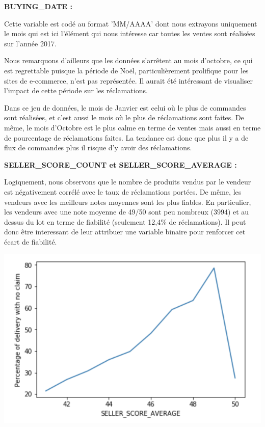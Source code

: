 \textbf{BUYING_DATE :}

Cette variable est codé au format 'MM/AAAA' dont nous extrayons uniquement le mois qui est ici 
l'élément qui nous intéresse car toutes les ventes sont réalisées sur l'année 2017.

Nous remarquons d'ailleurs que les données s'arrêtent au mois d'octobre, ce qui est regrettable
puisque la période de Noël, particulièrement prolifique pour les sites de e-commerce, n'est 
pas représentée. Il aurait été intéressant de visualiser l'impact de cette période sur les
réclamations.

Dans ce jeu de données, le mois de Janvier est celui où le plus de commandes sont réalisées,
et c'est aussi le mois où le plus de réclamations sont faites. De même, le mois d'Octobre
est le plus calme en terme de ventes mais aussi en terme de pourcentage de réclamations
faites. La tendance est donc que plus il y a de flux de commandes plus il risque d'y avoir
des réclamations.

\textbf{SELLER_SCORE_COUNT et SELLER_SCORE_AVERAGE :}

Logiquement, nous observons que le nombre de produits vendus par le vendeur est négativement
corrélé avec le taux de réclamations portées. De même, les vendeurs avec les meilleurs
notes moyennes sont les plus fiables. En particulier, les vendeurs avec une note moyenne de
49/50 sont peu nombreux (3994) et au dessus du lot en terme de fiabilité (seulement 12,4\%
de réclamations). Il peut donc être interessant de leur attribuer une variable binaire pour 
renforcer cet écart de fiabilité.

\begin{center}
\includegraphics[scale=0.5]{assets/sellerscore} 
\end{center}

